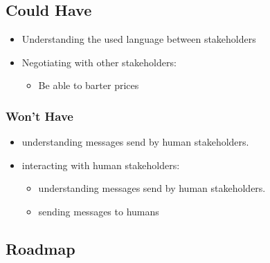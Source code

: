 \subsection{Could Have}
\begin{itemize}
	\item Understanding the used language between stakeholders
	\item Negotiating with other stakeholders:
	\begin{itemize}
		\item Be able to barter prices
	\end{itemize}
\end{itemize}

\subsubsection{Won’t Have}
\begin{itemize}
	\item understanding messages send by human stakeholders.
	\item interacting with human stakeholders:
	\begin{itemize}
		\item understanding messages send by human stakeholders.
		\item sending messages to humans
	\end{itemize}
\end{itemize}

\subsection{Roadmap}
\newpage
